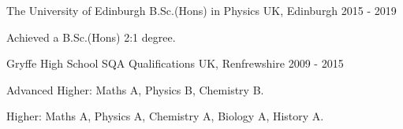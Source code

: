 



\begin{cventries}

  \cventry
    {The University of Edinburgh} %
    {B.Sc.(Hons) in Physics} %
    {UK, Edinburgh} %
    {2015 - 2019} %
    {
      \begin{cvitems} %
        \item{Achieved a B.Sc.(Hons) 2:1 degree.}
      \end{cvitems}
    }
    
  \cventry
    {Gryffe High School} %
    {SQA Qualifications} %
    {UK, Renfrewshire} %
    {2009 - 2015} %
    {
      \begin{cvitems} %
        \item {Advanced Higher: Maths A, Physics B, Chemistry B.}
        \item {Higher: Maths A, Physics A, Chemistry A, Biology A, History A.}
      \end{cvitems}
    }

\end{cventries}